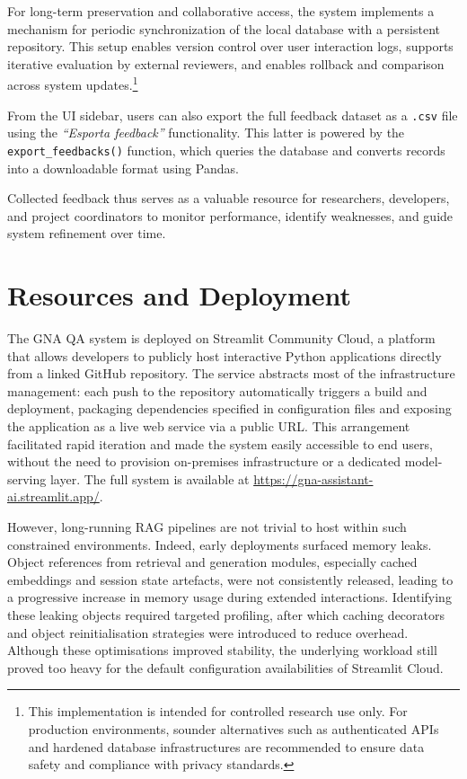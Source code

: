 \begin{spacing}{1.5}
For long-term preservation and collaborative access, the system implements a mechanism for periodic synchronization of the local database with a persistent repository. This setup enables version control over user interaction logs, supports iterative evaluation by external reviewers, and enables rollback and comparison across system updates.\footnote{This implementation is intended for controlled research use only. For production environments, sounder alternatives such as authenticated APIs and hardened database infrastructures are recommended to ensure data safety and compliance with privacy standards.}

From the UI sidebar, users can also export the full feedback dataset as a \texttt{.csv} file using the \textit{``Esporta feedback''} functionality. This latter is powered by the \texttt{export\_feedbacks()} function, which queries the database and converts records into a downloadable format using Pandas. 

Collected feedback thus serves as a valuable resource for researchers, developers, and project coordinators to monitor performance, identify weaknesses, and guide system refinement over time.


\section{Resources and Deployment}
The GNA QA system is deployed on Streamlit Community Cloud, a platform that allows developers to publicly host interactive Python applications directly from a linked GitHub repository. The service abstracts most of the infrastructure management: each push to the repository automatically triggers a build and deployment, packaging dependencies specified in configuration files and exposing the application as a live web service via a public URL. This arrangement facilitated rapid iteration and made the system easily accessible to end users, without the need to provision on-premises infrastructure or a dedicated model-serving layer. The full system is available at \url{https://gna-assistant-ai.streamlit.app/}.

However, long-running RAG pipelines are not trivial to host within such constrained environments. Indeed, early deployments surfaced memory leaks. Object references from retrieval and generation modules, especially cached embeddings and session state artefacts, were not consistently released, leading to a progressive increase in memory usage during extended interactions. Identifying these leaking objects required targeted profiling, after which caching decorators and object reinitialisation strategies were introduced to reduce overhead. Although these optimisations improved stability, the underlying workload still proved too heavy for the default configuration availabilities of Streamlit Cloud.


\end{spacing}
